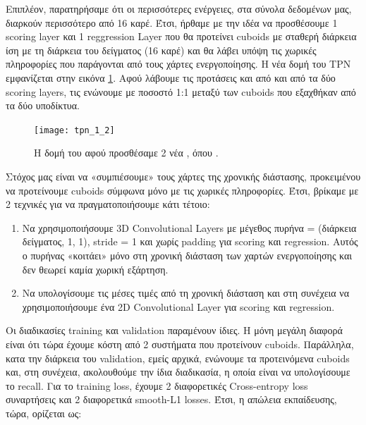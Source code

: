 Επιπλέον, παρατηρήσαμε ότι οι περισσότερες ενέργειες, στα σύνολα δεδομένων μας, διαρκούν περισσότερο από 16 καρέ. Έτσι, ήρθαμε με την ιδέα να προσθέσουμε 1 \en scoring layer \gr και 1
\en reggression Layer \gr που θα προτείνει \en cuboids  \gr με σταθερή διάρκεια ίση με τη διάρκεια του δείγματος (16 καρέ) και θα λάβει υπόψη τις χωρικές πληροφορίες που παράγονται
από τους χάρτες ενεργοποίησης. Η νέα δομή του \en TPN \gr εμφανίζεται στην εικόνα \ref{fig:gr_tpn_1_2}. Αφού λάβουμε τις προτάσεις και από και από τα δύο \en scoring layers\gr,
τις ενώνουμε με ποσοστό 1:1 μεταξύ των \en cuboids \gr που εξαχθήκαν από τα δύο υποδίκτυα.

\en
\begin{figure}[h]
  \centering
  \texttt{[image: tpn\_1\_2]}
  \caption{\gr Η δομή του  αφού προσθέσαμε 2 νέα , όπου .}

  \label{fig:gr_tpn_1_2}
\end{figure}
\gr

Στόχος μας είναι να «συμπιέσουμε» τους χάρτες της χρονικής διάστασης, προκειμένου να προτείνουμε \en cuboids \gr σύμφωνα μόνο με τις χωρικές πληροφορίες.
Έτσι, βρίκαμε με 2 τεχνικές για να πραγματοποιήσουμε κάτι τέτοιο:
\begin{enumerate}
\item Να χρησιμοποιήσουμε \en  3D Convolutional Layers \gr με μέγεθος πυρήνα = (διάρκεια δείγματος, 1, 1), \en stride \gr = 1 και χωρίς \en padding \gr για \en scoring \gr και \en regression\gr.
  Αυτός ο πυρήνας «κοιτάει» μόνο στη χρονική διάσταση των χαρτών ενεργοποίησης και δεν θεωρεί καμία χωρική εξάρτηση.
\item Nα υπολογίσουμε τις μέσες τιμές από τη χρονική διάσταση και στη συνέχεια να χρησιμοποιήσουμε ένα \en 2D Convolutional Layer \gr για \en scoring \gr και \en regression\gr.
\end{enumerate}

\par
Οι διαδικασίες \en training \gr και \en validation \gr παραμένουν ίδιες. Η μόνη μεγάλη διαφορά είναι ότι τώρα έχουμε κόστη  από 2  συστήματα που προτείνουν \en cuboids\gr.
Παράλληλα, κατα την διάρκεια του \en validation\gr, εμείς αρχικά, ενώνουμε τα προτεινόμενα \en cuboids \gr και, στη συνέχεια, ακολουθούμε την ίδια διαδικασία, η οποία είναι να
υπολογίσουμε το \en recall\gr. Για το \en training loss\gr, έχουμε 2 διαφορετικές \en Cross-entropy loss \gr συναρτήσεις και 2 διαφορετικά \en smooth-L1 losses\gr. Έτσι,
η απώλεια εκπαίδευσης, τώρα, ορίζεται ως:

